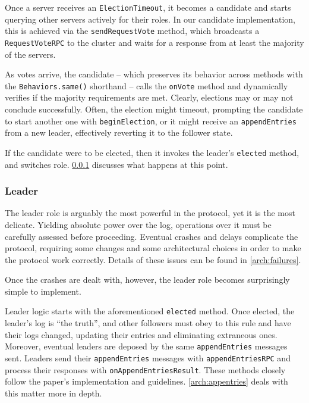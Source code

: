 Once a server receives an \texttt{ElectionTimeout}, it becomes a candidate and starts querying other servers actively for their roles. In our candidate implementation, this is achieved via the \texttt{sendRequestVote} method, which broadcasts a \texttt{RequestVoteRPC} to the cluster and waits for a response from at least the majority of the servers. 


As votes arrive, the candidate -- which preserves its behavior across methods with the \texttt{Behaviors.same()} shorthand -- calls the \texttt{onVote} method and dynamically verifies if the majority requirements are met. Clearly, elections may or may not conclude successfully. Often, the election might timeout, prompting the candidate to start another one with \texttt{beginElection}, or it might receive an \texttt{appendEntries} from a new leader, effectively reverting it to the follower state.

If the candidate were to be elected, then it invokes the leader's \texttt{elected} method, and switches role. \cref{arch:leader} discusses what happens at this point.

\subsubsection{Leader}
\label{arch:leader}

The leader role is arguably the most powerful in the protocol, yet it is the most delicate. Yielding absolute power over the log, operations over it must be carefully assessed before proceeding. Eventual crashes and delays complicate the protocol, requiring some changes and some architectural choices in order to make the protocol work correctly. Details of these issues can be found in \cref{arch:failures}.

Once the crashes are dealt with, however, the leader role becomes surprisingly simple to implement.


Leader logic starts with the aforementioned \texttt{elected} method. Once elected, the leader's log is ``the truth'', and other followers must obey to this rule and have their logs changed, updating their entries and eliminating extraneous ones. Moreover, eventual leaders are deposed by the same \texttt{appendEntries} messages sent. Leaders send their \texttt{appendEntries} messages with \texttt{appendEntriesRPC} and process their responses with \texttt{onAppendEntriesResult}. These methods closely follow the paper's implementation and guidelines. \cref{arch:appentries} deals with this matter more in depth.

